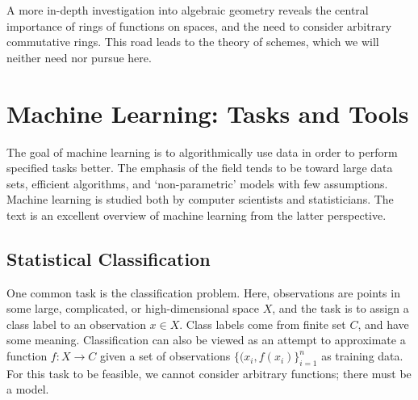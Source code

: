 \documentclass[cclicense]{hmcthesis}
\numberwithin{equation}{section}
\begin{document}
    A more in-depth investigation into algebraic geometry reveals the central
    importance of rings of functions on spaces, and the need to consider
    arbitrary commutative rings.  This road leads to the theory of schemes,
    which we will neither need nor pursue here.

\chapter{Machine Learning: Tasks and Tools}
    \label{sec:ML}

    The goal of machine learning is to algorithmically use data in order to
    perform specified tasks better.  The emphasis of the field tends to be
    toward large data sets, efficient algorithms, and `non-parametric' models
    with few assumptions.  Machine learning is studied both by computer
    scientists and statisticians.  The text \citep{EOSL} is an excellent overview
    of machine learning from the latter perspective.

\section{Statistical Classification}

    One common task is the classification problem.  Here, observations are
    points in some large, complicated, or high-dimensional space $X$, and the
    task is to assign a class label to an observation $x \in X$.  Class labels
    come from finite set $C$, and have some meaning.  Classification can also be
    viewed as an attempt to approximate a function $f : X \to C$ given a set of
    observations $\{(x_i, f(x_i)\}_{i=1}^n$ as training data.  For this task to
    be feasible, we cannot consider arbitrary functions; there must be a model.
\end{document}
